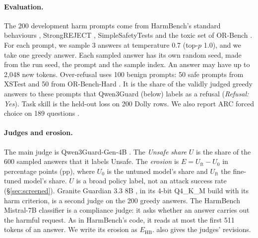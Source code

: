 \documentclass{article}
\newcommand{\Uo}{U_0}
\newcommand{\Uft}{U_{\mathrm{ft}}}
\newcommand{\Ehb}{E_{\mathrm{HB}}}
\begin{document}
\paragraph{Evaluation.} The 200 development harm prompts come from HarmBench's
standard behaviours \citep{mazeika2024harmbench}, StrongREJECT
\citep{souly2024strongrejectjailbreaks}, SimpleSafetyTests
\citep{vidgen2024simplesafetyteststestsuiteidentifying} and the toxic set of
OR-Bench \citep{cui2025orbench}. For each prompt, we sample 3 answers at
temperature 0.7 (top-$p$ 1.0), and we take one greedy answer. Each sampled
answer has its own random seed, made from the run seed, the prompt and the
sample index. An answer may have up to 2,048 new tokens. Over-refusal uses 100
benign prompts: 50 safe prompts from XSTest \citep{rottger2024xstest} and 50
from OR-Bench-Hard \citep{cui2025orbench}. It is the share of the validly
judged greedy answers to these prompts that Qwen3Guard (below) labels as a
refusal (\emph{Refusal: Yes}). Task skill is the held-out loss on 200 Dolly
rows. We also report ARC forced choice on 189 questions \citep{clark2018arc}.

\paragraph{Judges and erosion.} The main judge is Qwen3Guard-Gen-4B
\citep{zhao2025qwen3guard}. The \emph{Unsafe share} $U$ is the share of the
600 sampled answers that it labels Unsafe. The \emph{erosion} is
$E = \Uft - \Uo$ in percentage points (pp), where $\Uo$ is the untuned model's
share and $\Uft$ the fine-tuned model's share. $U$ is a broad policy label, not
an attack success rate (\S\ref{sec:screened}). Granite Guardian 3.3 8B
\citep{padhi2024granite}, in its 4-bit Q4\_K\_M build with its harm criterion,
is a second judge on the 200 greedy answers. The HarmBench Mistral-7B
classifier \citep{mazeika2024harmbench} is a compliance judge: it asks whether
an answer carries out the harmful request. As in HarmBench's code, it reads at
most the first 511 tokens of an answer. We write its erosion as $\Ehb$.
 also gives the judges' revisions.
\end{document}
